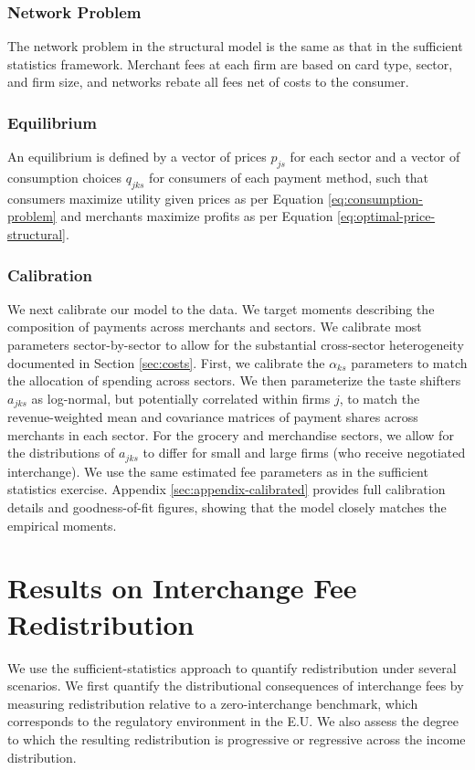 \documentclass[11pt,english]{article}
\theoremstyle{remark}
\begin{document}
\subsubsection{Network Problem}

The network problem in the structural model is the same as that in the sufficient statistics framework. Merchant fees at each firm are based on card type, sector, and firm size, and networks rebate all fees net of costs to the consumer.





\subsubsection{Equilibrium}

An equilibrium is defined by a vector of prices $p_{js}$ for each sector and a vector of consumption choices $q_{jks}$ for consumers of each payment method, such that consumers maximize utility given prices as per Equation \ref{eq:consumption-problem} and merchants maximize profits as per Equation \ref{eq:optimal-price-structural}.

\subsubsection{Calibration}

We next calibrate our model to the data.
We target moments describing the composition of payments across merchants and sectors.
We calibrate most parameters sector-by-sector to allow for the substantial cross-sector heterogeneity documented in Section \ref{sec:costs}.
First, we calibrate the $\alpha_{ks}$ parameters to match the allocation of spending across sectors.
We then parameterize the taste shifters $a_{jks}$ as log-normal, but potentially correlated within firms $j$, to match the revenue-weighted mean and covariance matrices of payment shares across merchants in each sector.
For the grocery and merchandise sectors, we allow for the distributions of $a_{jks}$ to differ for small and large firms (who receive negotiated interchange).
We use the same estimated fee parameters as in the sufficient statistics exercise.
Appendix \ref{sec:appendix-calibrated} provides full calibration details and goodness-of-fit figures, showing that the model closely matches the empirical moments.


\section{Results on Interchange Fee Redistribution}
\label{sec:Results}
We use the sufficient-statistics approach to quantify redistribution under several scenarios.
We first quantify the distributional consequences of interchange fees by measuring redistribution relative to a zero-interchange benchmark, which corresponds to the regulatory environment in the E.U.
We also assess the degree to which the resulting redistribution is progressive or regressive across the income distribution.
\end{document}
